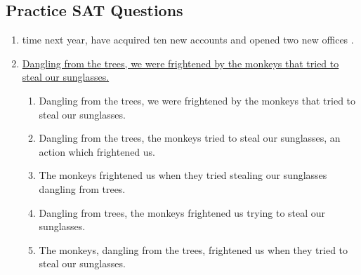 \subsection{Practice SAT Questions}

\begin{enumerate}

\item \begin{inparaenum}[A]
 time next year,   have acquired ten new accounts and  opened two new offices . 
\end{inparaenum}

\item \ul{Dangling from the trees, we were frightened by the monkeys that tried to steal our sunglasses.} 

\begin{enumerate}[label=(\Alph*)]
\item Dangling from the trees, we were frightened by the monkeys that tried to steal our sunglasses. 
\item Dangling from the trees, the monkeys tried to steal our sunglasses, an action which frightened us. 
\item The monkeys frightened us when they tried stealing our sunglasses dangling from trees. 
\item Dangling from trees, the monkeys frightened us trying to steal our sunglasses. 
\item The monkeys, dangling from the trees, frightened us when they tried to steal our sunglasses. 
\end{enumerate}

\end{enumerate}
